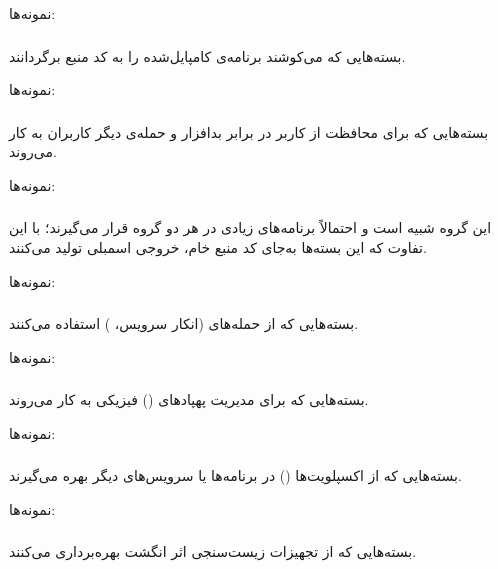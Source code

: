 \documentclass[a4paper, oneside, 11pt]{book}
\begin{document}
نمونه‌ها: 

\subsubsection{}
بسته‌هایی که می‌کوشند برنامه‌ی کامپایل‌شده را به کد منبع برگردانند.

نمونه‌ها: 

\subsubsection{}
بسته‌هایی که برای محافظت از کاربر در برابر بدافزار و حمله‌ی دیگر کاربران به کار
می‌روند.

نمونه‌ها: 

\subsubsection{}
این گروه شبیه  است و احتمالاً برنامه‌های زیادی در هر دو
گروه قرار می‌گیرند؛ با این تفاوت که این بسته‌ها به‌جای کد منبع خام، خروجی
اسمبلی تولید می‌کنند.

نمونه‌ها: 

\subsubsection{}
بسته‌هایی که از حمله‌های  (انکار سرویس، ) استفاده می‌کنند.

نمونه‌ها: 

\subsubsection{}
بسته‌هایی که برای مدیریت پهپادهای () فیزیکی به کار می‌روند.

نمونه‌ها: 

\subsubsection{}
بسته‌هایی که از اکسپلویت‌ها () در برنامه‌ها یا سرویس‌های دیگر بهره
می‌گیرند.

نمونه‌ها: 

\subsubsection{}
بسته‌هایی که از تجهیزات زیست‌سنجی اثر انگشت بهره‌برداری می‌کنند.
\end{document}
